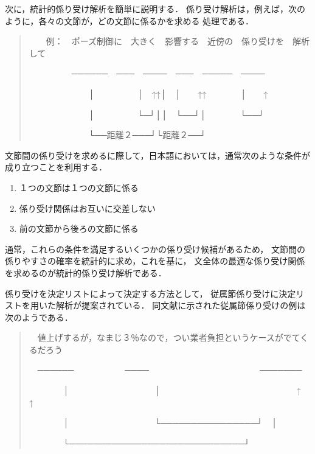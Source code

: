 次に，統計的係り受け解析を簡単に説明する．
係り受け解析は，例えば，次のように，各々の文節が，どの文節に係るかを求める
処理である．
\begin{quote}
　　例：　ポーズ制御に　大きく　影響する　近傍の　係り受けを　解析して
\vspace{-2mm}

　　　　　──────　───　────　───　─────　────
\vspace{-2mm}

　　　　　　　│　　　　　│　↑↑│　│　　↑↑　　　　│　　↑
\vspace{-2mm}

　　　　　　　│　　　　　└─┘││　└──┘│　　　　└──┘
\vspace{-2mm}

　　　　　　　└──距離２───┘└距離２──┘
\end{quote}
文節間の係り受けを求めるに際して，日本語においては，通常次のような条件が
成り立つことを利用する．
\begin{enumerate}
  \item １つの文節は１つの文節に係る
  \item 係り受け関係はお互いに交差しない
  \item 前の文節から後ろの文節に係る
\end{enumerate}
通常，これらの条件を満足するいくつかの係り受け候補があるため，
文節間の係りやすさの確率を統計的に求め，これを基に，
文全体の最適な係り受け関係を求めるのが統計的係り受け解析である．

係り受けを決定リストによって決定する方法として，
従属節係り受けに決定リストを用いた解析\cite{宇津呂1999}が提案されている．
同文献に示された従属節係り受けの例は次のようである．
\begin{quote}
　値上げするが，なまじ３％なので，つい業者負担というケースがでてくるだろう
\vspace{-2mm}

　──────　　　　　　────　　　　　　　　　　　　　───────
\vspace{-2mm}

　　　　│　　　　　　　　　　│　　　　　　　　　　　　　　　　↑　↑
\vspace{-2mm}

　　　　│　　　　　　　　　　└────────────────┘　│
\vspace{-2mm}

　　　　└─────────────────────────────┘
\end{quote}


